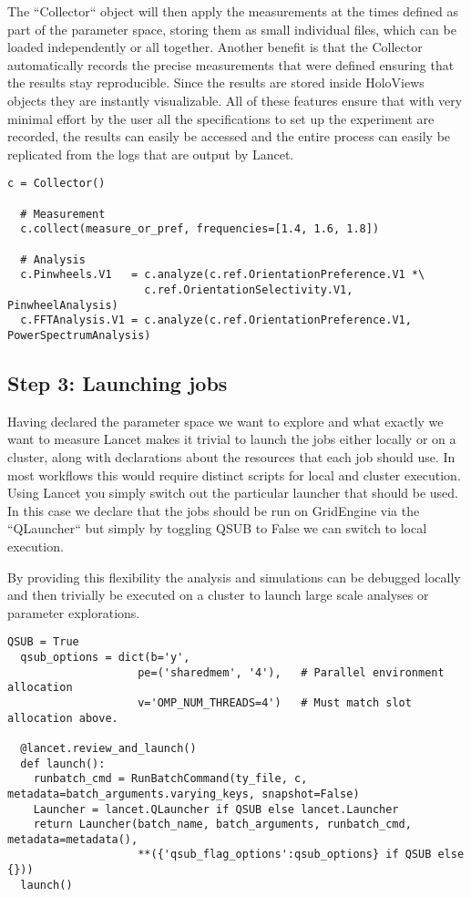 The ``Collector`` object will then apply the measurements at the times
defined as part of the parameter space, storing them as small
individual files, which can be loaded independently or all
together. Another benefit is that the Collector automatically records
the precise measurements that were defined ensuring that the results
stay reproducible. Since the results are stored inside HoloViews
objects they are instantly visualizable. All of these features ensure
that with very minimal effort by the user all the specifications to
set up the experiment are recorded, the results can easily be accessed
and the entire process can easily be replicated from the logs that are
output by Lancet.

\begin{lstlisting}[frame=single]
  c = Collector()

  # Measurement
  c.collect(measure_or_pref, frequencies=[1.4, 1.6, 1.8])

  # Analysis
  c.Pinwheels.V1   = c.analyze(c.ref.OrientationPreference.V1 *\
                     c.ref.OrientationSelectivity.V1, PinwheelAnalysis)
  c.FFTAnalysis.V1 = c.analyze(c.ref.OrientationPreference.V1, PowerSpectrumAnalysis)
\end{lstlisting}

\subsection{Step 3: Launching jobs}

Having declared the parameter space we want to explore and what
exactly we want to measure Lancet makes it trivial to launch the jobs
either locally or on a cluster, along with declarations about the
resources that each job should use. In most workflows this would
require distinct scripts for local and cluster execution. Using Lancet
you simply switch out the particular launcher that should be used. In
this case we declare that the jobs should be run on GridEngine via the
``QLauncher`` but simply by toggling QSUB to False we can switch to
local execution.

By providing this flexibility the analysis and simulations can be
debugged locally and then trivially be executed on a cluster to launch
large scale analyses or parameter explorations.


\begin{lstlisting}[frame=single]
  QSUB = True
  qsub_options = dict(b='y',
                    pe=('sharedmem', '4'),   # Parallel environment allocation
                    v='OMP_NUM_THREADS=4')   # Must match slot allocation above.

  @lancet.review_and_launch()
  def launch():
    runbatch_cmd = RunBatchCommand(ty_file, c, metadata=batch_arguments.varying_keys, snapshot=False)
    Launcher = lancet.QLauncher if QSUB else lancet.Launcher
    return Launcher(batch_name, batch_arguments, runbatch_cmd,  metadata=metadata(),
                    **({'qsub_flag_options':qsub_options} if QSUB else {}))
  launch()
\end{lstlisting}

